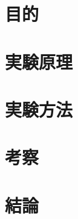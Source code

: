 \documentclass{ltjsarticle}
\newcounter{y}
\newcounter{h}
\begin{document}
  \section{目的}
  \section{実験原理}
  \section{実験方法}
  \section{考察}
  \section{結論}
\end{document}
